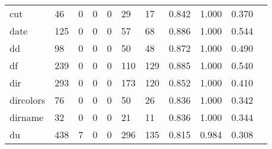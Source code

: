 \begin{longtable}{lp{1.10cm}p{1.10cm}p{1.10cm}p{1.10cm}p{1.10cm}p{1.10cm}p{1.10cm}p{1.10cm}p{1.10cm}p{1.10cm}}
cut       &                     46 &                                  0 &                                 0 &                                0 &                                29 &                              17 &                          0.842 &                                 1.000 &                               0.370 \\
date      &                    125 &                                  0 &                                 0 &                                0 &                                57 &                              68 &                          0.886 &                                 1.000 &                               0.544 \\
dd        &                     98 &                                  0 &                                 0 &                                0 &                                50 &                              48 &                          0.872 &                                 1.000 &                               0.490 \\
df        &                    239 &                                  0 &                                 0 &                                0 &                               110 &                             129 &                          0.885 &                                 1.000 &                               0.540 \\
dir       &                    293 &                                  0 &                                 0 &                                0 &                               173 &                             120 &                          0.852 &                                 1.000 &                               0.410 \\
dircolors &                     76 &                                  0 &                                 0 &                                0 &                                50 &                              26 &                          0.836 &                                 1.000 &                               0.342 \\
dirname   &                     32 &                                  0 &                                 0 &                                0 &                                21 &                              11 &                          0.836 &                                 1.000 &                               0.344 \\
du        &                    438 &                                  7 &                                 0 &                                0 &                               296 &                             135 &                          0.815 &                                 0.984 &                               0.308 \\

\end{longtable}
